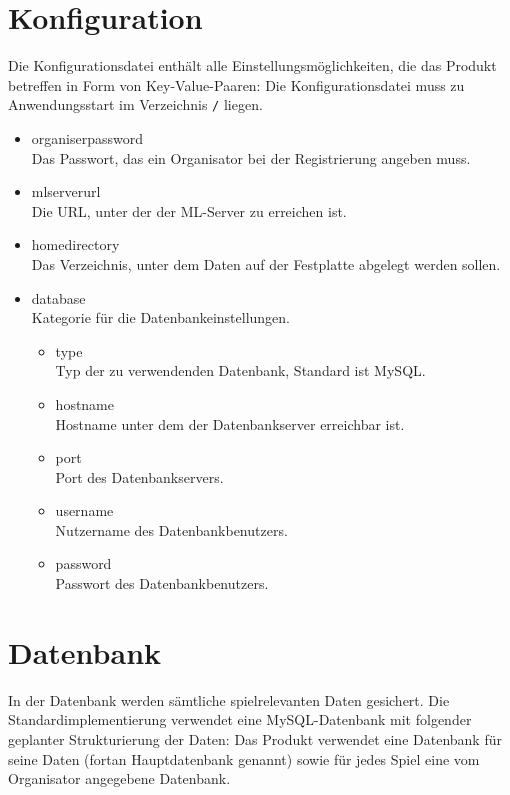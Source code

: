 \documentclass[a4paper]{scrreprt}
\begin{document}
	\section{Konfiguration}
	Die Konfigurationsdatei enthält alle Einstellungsmöglichkeiten, die das Produkt betreffen in Form von Key-Value-Paaren:
	Die Konfigurationsdatei muss zu Anwendungsstart im Verzeichnis \texttt{/} liegen. %
	\begin{itemize}
		\item organiserpassword \\Das Passwort, das ein Organisator bei der Registrierung angeben muss.
		\item mlserverurl       \\Die URL, unter der der ML-Server zu erreichen ist.
		\item homedirectory     \\Das Verzeichnis, unter dem Daten auf der Festplatte abgelegt werden sollen.
		\item database          \\Kategorie für die Datenbankeinstellungen.
		\begin{itemize}
			\item type          \\Typ der zu verwendenden Datenbank, Standard ist MySQL.
			\item hostname      \\Hostname unter dem der Datenbankserver erreichbar ist.
			\item port          \\Port des Datenbankservers.
			\item username      \\Nutzername des Datenbankbenutzers.
			\item password      \\Passwort des Datenbankbenutzers.
		\end{itemize}
	\end{itemize}

	\section{Datenbank}
	In der Datenbank werden sämtliche spielrelevanten Daten gesichert.
	Die Standardimplementierung verwendet eine MySQL-Datenbank mit folgender geplanter Strukturierung der Daten:
	Das Produkt verwendet eine Datenbank für seine Daten (fortan Hauptdatenbank genannt) sowie für jedes Spiel eine vom Organisator angegebene Datenbank.
\end{document}
